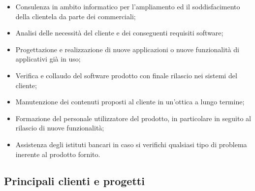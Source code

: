 	\begin{itemize}
		\item Consulenza in ambito informatico per l'ampliamento ed il soddisfacimento della clientela da parte dei commerciali;
		\item Analisi delle necessità del cliente e dei conseguenti requisiti software;
		\item Progettazione e realizzazione di nuove applicazioni o nuove funzionalità di applicativi già in uso;
		\item Verifica e collaudo del software prodotto con finale rilascio nei sistemi del cliente;
		\item Manutenzione dei contenuti proposti al cliente in un'ottica a lungo termine;
		\item Formazione del personale utilizzatore del prodotto, in particolare in seguito al rilascio di nuove funzionalità;
		\item Assistenza degli istituti bancari in caso si verifichi qualsiasi tipo di problema inerente al prodotto fornito.
	\end{itemize}
\newpage
	\subsection{Principali clienti e progetti}
	
